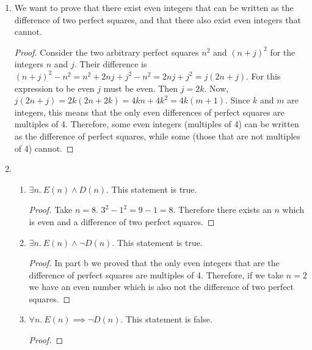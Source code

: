 \documentclass{article}
\begin{document}
\begin{enumerate}
\begin{enumerate}
    We want to prove that every odd integer can be written as the difference of two perfect squares.
    \begin{proof}
      Consider two consecutive perfect squares $n^2$ and $(n+1)^2$ for an integer $n$.
      Their difference is $(n+1)^2 - n^2 = n^2 + 2n + 1 - n^2 = 2n + 1$.
      Since every odd number can be written as $2k + 1$ for an integer $k$, every odd number can be written as the difference of two perfect squares.
    \end{proof}
  \item
    We want to prove that there exist even integers that can be written as the difference of two perfect squares, and that there also exist even integers that cannot.
    \begin{proof}
      Consider the two arbitrary perfect squares $n^2$ and $(n + j)^2$ for the integers $n$ and $j$.
      Their difference is $(n + j)^2 - n^2 = n^2 + 2nj + j^2 - n^2 = 2nj + j^2 = j(2n + j)$.
      For this expression to be even $j$ must be even.
      Then $j = 2k$.
      Now, $j(2n + j) = 2k(2n + 2k) = 4kn + 4k^2 = 4k(m + 1)$.
      Since $k$ and $m$ are integers, this means that the only even differences of perfect squares are multiples of 4.
      Therefore, some even integers (multiples of 4) can be written as the difference of perfect squares, while some (those that are not multiples of 4) cannot.
    \end{proof}
  \item
    \begin{enumerate}
    \item
      $\exists n.\ E(n) \land D(n)$.
      This statement is true.
      \begin{proof}
        Take $n = 8$.
        $3^2 - 1^2 = 9 - 1 = 8$.
        Therefore there exists an $n$ which is even and a difference of two perfect squares.
      \end{proof}
    \item
      $\exists n.\ E(n) \land \neg D(n)$.
      This statement is true.
      \begin{proof}
        In part b we proved that the only even integers that are the difference of perfect squares are multiples of 4.
        Therefore, if we take $n = 2$ we have an even number which is also not the difference of two perfect squares.
      \end{proof}
    \item
      $\forall n.\ E(n) \implies \neg D(n)$.
      This statement is false.
      \begin{proof}

\end{proof}
\end{enumerate}
\end{enumerate}
\end{enumerate}
\end{document}
